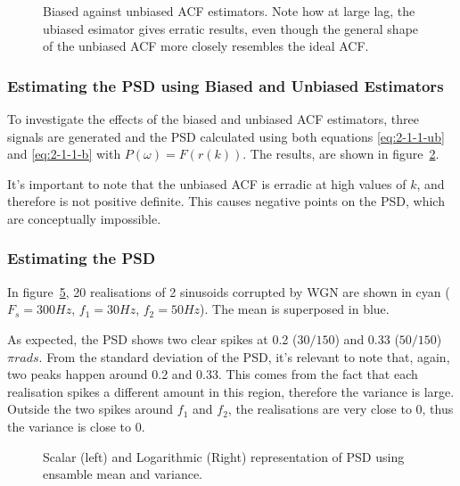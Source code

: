 \documentclass[main.tex]{subfiles}
\begin{document}
\begin{figure}[H]
	\centering 
	\resizebox{\textwidth}{!}{}
	\caption{Biased against unbiased ACF estimators. Note how at large lag, the ubiased esimator gives erratic results, even though the general shape of the unbiased ACF more closely resembles the ideal ACF. }
	\label{fig:2-1-a-vs}
\end{figure}

\subsubsection{Estimating the PSD using Biased and Unbiased Estimators}

To investigate the effects of the biased and unbiased ACF estimators, three signals are generated and the PSD calculated using both equations \ref{eq:2-1-1-ub} and \ref{eq:2-1-1-b} with $P(\omega) = F(r(k))$. The results, are shown in figure~\ref{fig:q2_1_a}.

\begin{figure}[H]
	\centering 
	\resizebox{\textwidth}{!}{}
	\caption{}
	\label{fig:q2_1_a}
\end{figure}

It's important to note that the unbiased ACF is erradic at high values of $k$, and therefore is not positive definite. This causes negative points on the PSD, which are conceptually impossible. 





\subsubsection{Estimating the PSD}

In figure~\ref{fig:2-1-b}, 20 realisations of 2 sinusoids corrupted by WGN are shown in cyan ($F_s = 300Hz$, $f_1= 30Hz$, $f_2=50Hz$). The mean is superposed in blue. 

As expected, the PSD shows two clear spikes at 0.2 ($30/150$) and 0.33 ($50/150$)$\pi rads$. From the standard deviation of the PSD, it's relevant to note that, again, two peaks happen around 0.2 and 0.33. This comes from the fact that each realisation spikes a different amount in this region, therefore the variance is large. Outside the two spikes around $f_1$ and $f_2$, the realisations are very close to 0, thus the variance is close to 0.

\begin{figure}[H]
	\centering
	\begin{subfigure}[b]{0.9\textwidth}
		\resizebox{\textwidth}{!}{}
		\label{fig:2-1-b-a}
	\end{subfigure}%
	
	\begin{subfigure}[b]{0.9\textwidth}
		\resizebox{\textwidth}{!}{}
		\label{fig:2-1-b-b}
	\end{subfigure}
	\caption{Scalar (left) and Logarithmic (Right) representation of PSD using ensamble mean and variance.}
	\label{fig:2-1-b}
\end{figure}
\end{document}

